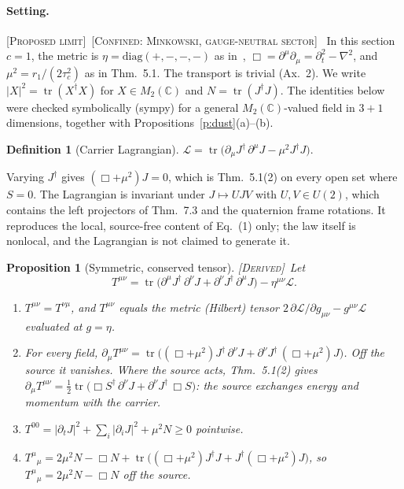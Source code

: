 \documentclass[10pt]{article}
\newcommand{\tr}{\operatorname{tr}}
\newtheorem{proposition}[theorem]{Proposition}
\theoremstyle{definition}
\newtheorem{definition}[theorem]{Definition}
\newcommand{\Derived}{\textup{\textsc{[Derived]}}\ }
\newcommand{\ProposedLimit}{\textup{\textsc{[Proposed limit]}}\ }
\newcommand{\Confined}[1]{\textup{\textsc{[Confined: #1]}}\ }
\begin{document}
\paragraph{Setting.} \ProposedLimit \Confined{Minkowski, gauge-neutral sector} In this section $c=1$, the metric is $\eta=\mathrm{diag}(+,-,-,-)$ as in~\cite{feyn}, $\Box=\partial^\mu\partial_\mu=\partial_t^2-\nabla^2$, and $\mu^2=r_1/(2\tau_c^2)$ as in Thm.~5.1. The transport is trivial (Ax.~2). We write $|X|^2=\tr(X^\dagger X)$ for $X\in M_2(\mathbb C)$ and $N=\tr(J^\dagger J)$. The identities below were checked symbolically (sympy) for a general $M_2(\mathbb C)$-valued field in $3+1$ dimensions, together with Propositions~\ref{p:dust}(a)--(b).

\begin{definition}[Carrier Lagrangian]\label{d:lag}
$\mathcal L=\tr\big(\partial_\mu J^\dagger\,\partial^\mu J-\mu^2J^\dagger J\big)$.
\end{definition}

Varying $J^\dagger$ gives $(\Box+\mu^2)J=0$, which is Thm.~5.1(2) on every open set where $S=0$. The Lagrangian is invariant under $J\mapsto UJV$ with $U,V\in U(2)$, which contains the left projectors of Thm.~7.3 and the quaternion frame rotations. It reproduces the local, source-free content of Eq.~(1) only; the law itself is nonlocal, and the Lagrangian is not claimed to generate it.

\begin{proposition}[Symmetric, conserved tensor]\label{p:T}
\Derived Let
\begin{equation}\label{e:T}
T^{\mu\nu}=\tr\big(\partial^\mu J^\dagger\,\partial^\nu J+\partial^\nu J^\dagger\,\partial^\mu J\big)-\eta^{\mu\nu}\mathcal L .
\end{equation}
\begin{enumerate}\itemsep1pt
\item[(i)] $T^{\mu\nu}=T^{\nu\mu}$, and $T^{\mu\nu}$ equals the metric (Hilbert) tensor $2\,\partial\mathcal L/\partial g_{\mu\nu}-g^{\mu\nu}\mathcal L$ evaluated at $g=\eta$.
\item[(ii)] For every field, $\partial_\mu T^{\mu\nu}=\tr\big((\Box+\mu^2)J^\dagger\,\partial^\nu J+\partial^\nu J^\dagger\,(\Box+\mu^2)J\big)$. Off the source it vanishes. Where the source acts, Thm.~5.1(2) gives $\partial_\mu T^{\mu\nu}=\tfrac12\tr\big(\Box S^\dagger\,\partial^\nu J+\partial^\nu J^\dagger\,\Box S\big)$: the source exchanges energy and momentum with the carrier.
\item[(iii)] $T^{00}=|\partial_tJ|^2+\sum_i|\partial_iJ|^2+\mu^2N\ge0$ pointwise.
\item[(iv)] $T^\mu{}_\mu=2\mu^2N-\Box N+\tr\big((\Box+\mu^2)J^\dagger J+J^\dagger(\Box+\mu^2)J\big)$, so $T^\mu{}_\mu=2\mu^2N-\Box N$ off the source.
\end{enumerate}
\end{proposition}
\end{document}
